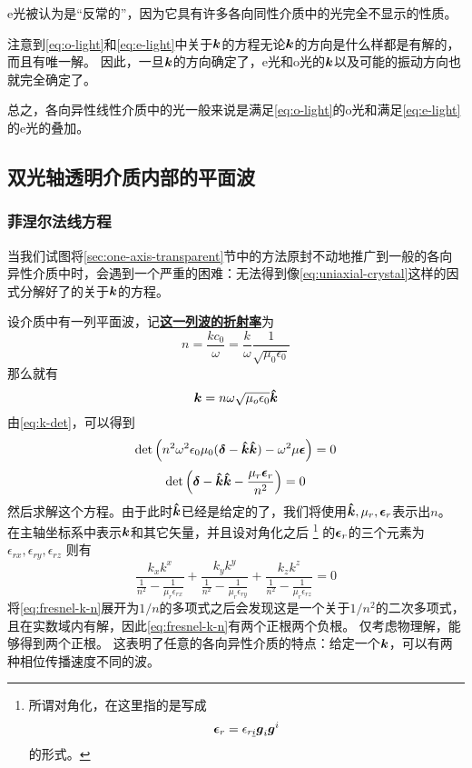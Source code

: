 \documentclass[UTF8, a4paper]{ctexart}
\newcommand*{\concept}[1]{\underline{\textbf{#1}}}
\begin{document}
e光被认为是“反常的”，因为它具有许多各向同性介质中的光完全不显示的性质。

注意到\eqref{eq:o-light}和\eqref{eq:e-light}中关于$\vb*{k}$的方程无论$\vb*{k}$的方向是什么样都是有解的，而且有唯一解。
因此，一旦$\vb*{k}$的方向确定了，e光和o光的$\vb*{k}$以及可能的振动方向也就完全确定了。

总之，各向异性线性介质中的光一般来说是满足\eqref{eq:o-light}的o光和满足\eqref{eq:e-light}的e光的叠加。

\subsection{双光轴透明介质内部的平面波}

\subsubsection{菲涅尔法线方程}

当我们试图将\ref{sec:one-axis-transparent}节中的方法原封不动地推广到一般的各向异性介质中时，会遇到一个严重的困难：无法得到像\eqref{eq:uniaxial-crystal}这样的因式分解好了的关于$\vb*{k}$的方程。

设介质中有一列平面波，记\concept{这一列波的折射率}为
\begin{equation}
    n = \frac{k c_0}{\omega} = \frac{k}{\omega} \frac{1}{\sqrt{\mu_0 \epsilon_0}}
\end{equation}
那么就有
\[
    \vb*{k} = n \omega \sqrt{\mu_o \epsilon_0} \vu*{k}
\]
由\eqref{eq:k-det}，可以得到
\[
    \det \left( n^2 \omega^2 \epsilon_0 \mu_0 (\vb*{\delta} - \vu*{k} \vu*{k}) - \omega^2 \mu \vb*{\epsilon} \right) = 0
\]
\[
    \det \left( \vb*{\delta} - \vu*{k} \vu*{k} - \frac{\mu_r \vb*{\epsilon}_r}{n^2} \right) = 0
\]
然后求解这个方程。由于此时$\vu*{k}$已经是给定的了，我们将使用$\vu*{k}, \mu_r, \vb*{\epsilon}_r$表示出$n$。
在主轴坐标系中表示$\vb*{k}$和其它矢量，并且设对角化之后%
\footnote{
    所谓对角化，在这里指的是写成
    \[
        \vb*{\epsilon}_r = \epsilon_{r \underline{i}} \vb*{g}_i \vb*{g}^i
    \]
    的形式。
}%
的$\vb*{\epsilon}_r$的三个元素为$\epsilon_{rx}, \epsilon_{ry}, \epsilon_{rz}$
则有
\begin{equation}
    \frac{k_x k^x}{\frac{1}{n^2} - \frac{1}{\mu_r \epsilon_{rx}}} + \frac{k_y k^y}{\frac{1}{n^2} - \frac{1}{\mu_r \epsilon_{ry}}} + \frac{k_z k^z}{\frac{1}{n^2} - \frac{1}{\mu_r \epsilon_{rz}}} = 0
    \label{eq:fresnel-k-n}
\end{equation}
将\eqref{eq:fresnel-k-n}展开为$1/n$的多项式之后会发现这是一个关于$1/n^2$的二次多项式，且在实数域内有解，因此\eqref{eq:fresnel-k-n}有两个正根两个负根。
仅考虑物理解，能够得到两个正根。
这表明了任意的各向异性介质的特点：给定一个$\vb*{k}$，可以有两种相位传播速度不同的波。
\end{document}
